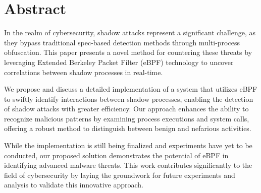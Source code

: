 
\section*{Abstract}
In the realm of cybersecurity, shadow attacks represent a significant challenge,
as they bypass traditional spec-based detection methods through multi-process obfuscation.
This paper presents a novel method for countering these threats by leveraging
Extended Berkeley Packet Filter (eBPF) technology to uncover correlations
between shadow processes in real-time.

We propose and discuss a detailed implementation of a system that utilizes
eBPF to swiftly identify interactions between shadow processes,
enabling the detection of shadow attacks with greater efficiency.
Our approach enhances the ability to recognize malicious patterns by examining process executions and system calls, offering a robust method to distinguish between benign and nefarious activities.

While the implementation is still being finalized and experiments have yet to be conducted, our proposed solution demonstrates the potential of eBPF in identifying advanced malware threats. This work contributes significantly to the field of cybersecurity by laying the groundwork for future experiments and analysis to validate this innovative approach.






